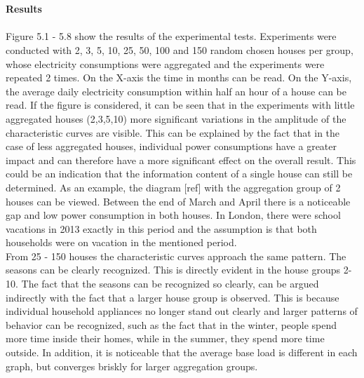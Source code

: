 \\
\\
\textbf{Results}
\\
\\
Figure 5.1 - 5.8 show the results of the experimental tests. Experiments were conducted with 2, 3, 5, 10, 25, 50, 100 and 150 random chosen houses per group, whose electricity consumptions were aggregated and the experiments were repeated 2 times. On the X-axis the time in months can be read. On the Y-axis, the average daily electricity consumption within half an hour of a house can be read. If the figure is considered, it can be seen that in the experiments with little aggregated houses (2,3,5,10) more significant variations in the amplitude of the characteristic curves are visible. This can be explained by the fact that in the case of less aggregated houses, individual power consumptions have a greater impact and can therefore have a more significant effect on the overall result. This could be an indication that the information content of a single house can still be determined. As an example, the diagram [ref] with the aggregation group of 2 houses can be viewed. Between the end of March and April there is a noticeable gap and low power consumption in both houses. In London, there were school vacations in 2013 exactly in this period and the assumption is that both households were on vacation in the mentioned period.\\
From 25 - 150 houses the characteristic curves approach the same pattern. The seasons can be clearly recognized. This is directly evident in the house groups 2-10. The fact that the seasons can be recognized so clearly, can be argued indirectly with the fact that a larger house group is observed. This is because individual household appliances no longer stand out clearly and larger patterns of behavior can be recognized, such as the fact that in the winter, people spend more time inside their homes, while in the summer, they spend more time outside. In addition, it is noticeable that the average base load is different in each graph, but converges briskly for larger aggregation groups. 

